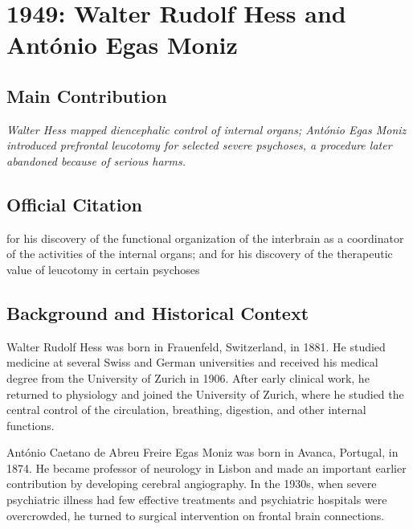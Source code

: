 \chapter[1949 --- Hess and Moniz]{1949: Walter Rudolf Hess and Ant\'onio Egas Moniz}
\label{ch:1949_Hess}

\section*{Main Contribution}

\textit{Walter Hess mapped diencephalic control of internal organs; Ant\'onio Egas Moniz introduced prefrontal leucotomy for selected severe psychoses, a procedure later abandoned because of serious harms.}\cite{nobel-1949,lecture-1949}

\section{Official Citation}

for his discovery of the functional organization of the interbrain as a coordinator of the activities of the internal organs; and for his discovery of the therapeutic value of leucotomy in certain psychoses

\section{Background and Historical Context}

Walter Rudolf Hess was born in Frauenfeld, Switzerland, in 1881. He studied medicine at several Swiss and German universities and received his medical degree from the University of Zurich in 1906. After early clinical work, he returned to physiology and joined the University of Zurich, where he studied the central control of the circulation, breathing, digestion, and other internal functions.

Ant\'onio Caetano de Abreu Freire Egas Moniz was born in Avanca, Portugal, in 1874. He became professor of neurology in Lisbon and made an important earlier contribution by developing cerebral angiography. In the 1930s, when severe psychiatric illness had few effective treatments and psychiatric hospitals were overcrowded, he turned to surgical intervention on frontal brain connections.

